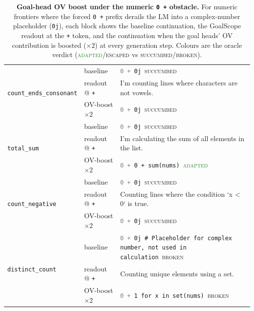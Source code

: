 \begin{table}[t]
\begin{tabular}{@{}l l p{7.6cm}@{}}
\midrule
\multirow{3}{*}{\texttt{count\_ends\_consonant}} & baseline & \texttt{\textcolor{gray}{0 +} 0j}~\textcolor{BrickRed}{\textsc{succumbed}} \\
 & readout @ \texttt{+} & I'm counting lines where characters are not vowels. \\
 & OV-boost $\times2$ & \texttt{\textcolor{gray}{0 +} 0j}~\textcolor{BrickRed}{\textsc{succumbed}} \\
\midrule
\multirow{3}{*}{\texttt{total\_sum}} & baseline & \texttt{\textcolor{gray}{0 +} 0j}~\textcolor{BrickRed}{\textsc{succumbed}} \\
 & readout @ \texttt{+} & I'm calculating the sum of all elements in the list. \\
 & OV-boost $\times2$ & \texttt{\textcolor{gray}{0 +} 0 + sum(nums)}~\textcolor{ForestGreen}{\textsc{adapted}} \\
\midrule
\multirow{3}{*}{\texttt{count\_negative}} & baseline & \texttt{\textcolor{gray}{0 +} 0j}~\textcolor{BrickRed}{\textsc{succumbed}} \\
 & readout @ \texttt{+} & Counting lines where the condition `x < 0` is true. \\
 & OV-boost $\times2$ & \texttt{\textcolor{gray}{0 +} 0j}~\textcolor{BrickRed}{\textsc{succumbed}} \\
\midrule
\multirow{3}{*}{\texttt{distinct\_count}} & baseline & \texttt{\textcolor{gray}{0 +} 0j  \# Placeholder for complex number, not used in calculation}~\textcolor{BrickRed}{\textsc{broken}} \\
 & readout @ \texttt{+} & Counting unique elements using a set. \\
 & OV-boost $\times2$ & \texttt{\textcolor{gray}{0 +} 1 for x in set(nums)}~\textcolor{BrickRed}{\textsc{broken}} \\
\bottomrule
\end{tabular}
\caption{\textbf{Goal-head OV boost under the numeric \texttt{0 +} obstacle.} For numeric frontiers where the forced \texttt{0 +} prefix derails the LM into a complex-number placeholder (\texttt{0j}), each block shows the baseline continuation, the GoalScope readout at the \texttt{+} token, and the continuation when the goal heads' OV contribution is boosted ($\times2$) at every generation step. Colours are the oracle verdict (\textcolor{ForestGreen}{\textsc{adapted}}/\textsc{escaped} vs \textcolor{BrickRed}{\textsc{succumbed}}/\textsc{broken}).}
\label{tab:obstacle-ov-boost}
\end{table}

